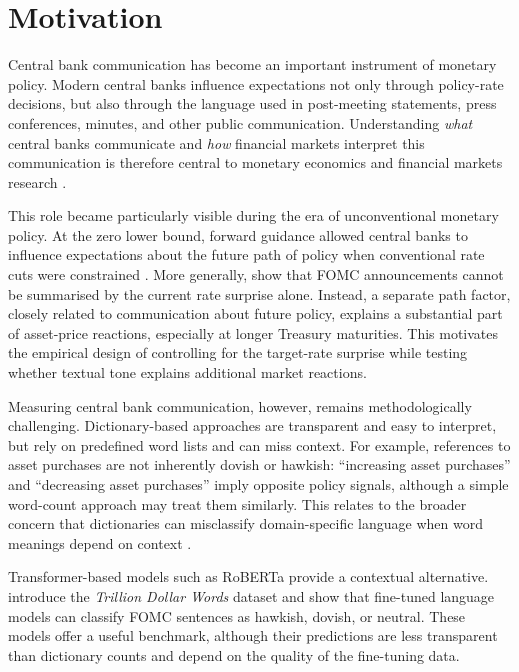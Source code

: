 
\section{Motivation}
\label{sec:intro_motivation}

Central bank communication has become an important instrument of
monetary policy. Modern central banks influence expectations not
only through policy-rate decisions, but also through the language
used in post-meeting statements, press conferences, minutes, and
other public communication. Understanding \emph{what} central banks
communicate and \emph{how} financial markets interpret this
communication is therefore central to monetary economics and
financial markets research \citep{blinder2008}.

This role became particularly visible during the era of
unconventional monetary policy. At the zero lower bound, forward
guidance allowed central banks to influence expectations about the
future path of policy when conventional rate cuts were constrained
\citep{campbell2012, swanson2021}. More generally,
\citet{gurkaynak2005} show that FOMC announcements cannot be
summarised by the current rate surprise alone. Instead, a separate
path factor, closely related to communication about future policy,
explains a substantial part of asset-price reactions, especially at
longer Treasury maturities. This motivates the empirical design of
controlling for the target-rate surprise while testing whether
textual tone explains additional market reactions.

Measuring central bank communication, however, remains
methodologically challenging. Dictionary-based approaches are
transparent and easy to interpret, but rely on predefined word lists
and can miss context. For example, references to asset purchases are
not inherently dovish or hawkish: ``increasing asset purchases'' and
``decreasing asset purchases'' imply opposite policy signals,
although a simple word-count approach may treat them similarly. This
relates to the broader concern that dictionaries can misclassify
domain-specific language when word meanings depend on context
\citep{loughran2011}.

Transformer-based models such as RoBERTa provide a contextual
alternative. \citet{shah2023} introduce the \emph{Trillion Dollar
Words} dataset and show that fine-tuned language models can classify
FOMC sentences as hawkish, dovish, or neutral. These models offer a
useful benchmark, although their predictions are less transparent
than dictionary counts and depend on the quality of the fine-tuning
data.

